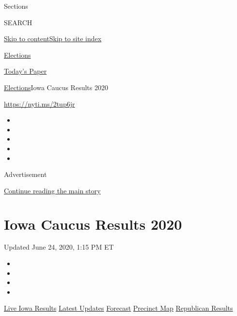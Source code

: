 Sections

SEARCH

\protect\hyperlink{site-content}{Skip to
content}\protect\hyperlink{site-index}{Skip to site index}

\href{https://www.nytimes.com/news-event/2020-election}{Elections}

\href{https://myaccount.nytimes.com/auth/login?response_type=cookie\&client_id=vi}{}

\href{https://www.nytimes.com/section/todayspaper}{Today's Paper}

\href{/news-event/2020-election}{Elections}\textbar{}Iowa Caucus Results
2020

\url{https://nyti.ms/2tup6jr}

\begin{itemize}
\item
\item
\item
\item
\item
\end{itemize}

Advertisement

\protect\hyperlink{after-top}{Continue reading the main story}

\hypertarget{iowa-caucus-results-2020}{%
\section{Iowa Caucus Results 2020}\label{iowa-caucus-results-2020}}

Updated June 24, 2020, 1:15 PM ET

\begin{itemize}
\item
\item
\item
\item
\end{itemize}

\href{https://www.nytimes.com/interactive/2020/02/04/us/elections/results-iowa-caucus.html?action=click\&module=ELEX_results\&pgtype=Interactive\&region=Navigation}{Live
Iowa Results}
\href{https://www.nytimes.com/interactive/2020/02/03/us/elections/results-iowa-caucus-live-updates.html?action=click\&module=ELEX_results\&pgtype=Interactive\&region=Navigation}{Latest
Updates}
\href{https://www.nytimes.com/interactive/2020/02/03/us/elections/results-iowa-caucus-live-forecast.html?action=click\&module=ELEX_results\&pgtype=Interactive\&region=Navigation}{Forecast}
\href{https://www.nytimes.com/interactive/2020/02/03/us/elections/results-iowa-caucus-precinct-map.html?action=click\&module=ELEX_results\&pgtype=Interactive\&region=Navigation}{Precinct
Map}
\href{https://www.nytimes.com/interactive/2020/02/03/us/elections/results-iowa-caucus-republicans.html?action=click\&module=ELEX_results\&pgtype=Interactive\&region=Navigation}{Republican
Results}

